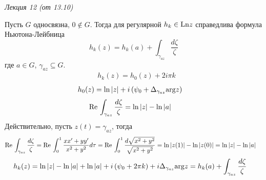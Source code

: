 \begin{flushright}
    \textit{Лекция 12 (от 13.10)}
\end{flushright}
\corollary
Пусть $G$ односвязна, $0 \not \in G$. Тогда для регулярной $h_k \in \mathrm{Ln} z$
справедлива формула Ньютона-Лейбница
\begin{equation}\label{(15.14)}
    h_k(z) = h_k(a) + \int_{\gamma_{az}}\frac{d\zeta}{\zeta}
\end{equation}
где $a \in G$, $\gamma_{az} \subseteq G$.
\pr
\begin{align*}
  & h_k(z) = h_0(z) + 2i \pi k
\end{align*}
\begin{align*}
  & h_0(z) = \ln \left| z \right| + i \left( \psi_0 + \Delta_{\gamma_{az}}\mathrm{arg} z \right)
\end{align*}
\begin{align*}
  & \mathrm{Re}\, \int_{\gamma_{az}} \frac{d\zeta}{\zeta} = \ln \left| z \right| - \ln \left| a \right|
\end{align*}
Действительно, пусть $z(t) = \gamma_{az}$, тогда
\begin{align*}
  & \mathrm{Re}\, \int_{\gamma_{az}} \frac{d\zeta}{\zeta} = \mathrm{Re}\, \int_0^1 \frac{xx'+yy'}{x^2+y^2} d \tau = \mathrm{Re}\, \int_0^1 \frac{d \sqrt{x^2+y^2}}{\sqrt{x^2+y^2}} = \ln \left| z(1) \right| - \ln \left| z(0) \right| = \ln \left| z \right| - \ln \left| a \right|
\end{align*}
\begin{align*}
  & h_k(z) = \ln \left| z \right| - \ln \left| a \right| + \ln\left| a \right| + i \left( \psi_0 + 2 \pi k \right) + i \Delta_{\gamma_{az}}\mathrm{arg} z = h_k(a) + \int_{\gamma_{az}}\frac{d\zeta}{\zeta}
\end{align*}
